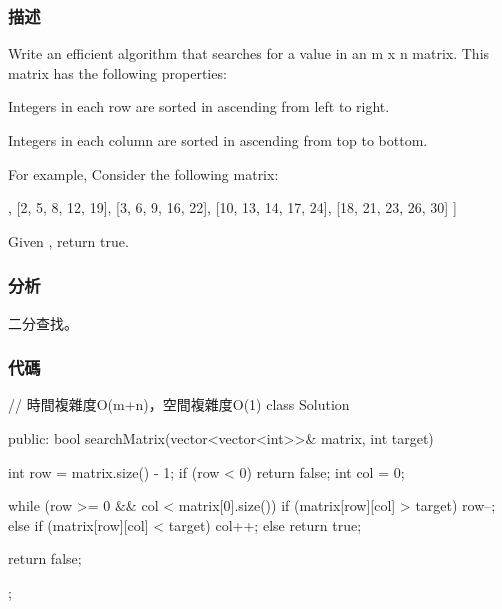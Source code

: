 \subsubsection{描述}
Write an efficient algorithm that searches for a value in an m x n matrix. This matrix has the following properties:
\begindot
\item Integers in each row are sorted in ascending from left to right.
\item Integers in each column are sorted in ascending from top to bottom.
\myenddot

For example, Consider the following matrix:
\begin{Code}
[
  [1,   4,  7, 11, 15],
  [2,   5,  8, 12, 19],
  [3,   6,  9, 16, 22],
  [10, 13, 14, 17, 24],
  [18, 21, 23, 26, 30]
]
\end{Code}
Given , return true.


\subsubsection{分析}
二分查找。


\subsubsection{代碼}
\begin{Code}
// 時間複雜度O(m+n)，空間複雜度O(1)
class Solution {
public:
    bool searchMatrix(vector<vector<int>>& matrix, int target) {
        int row = matrix.size() - 1;
        if (row < 0) return false;
        int col = 0;

        while (row >= 0 && col < matrix[0].size())
        {
            if (matrix[row][col] > target)
                row--;
            else if (matrix[row][col] < target)
                col++;
            else
                return true;
        }

        return false;
    }
};
\end{Code}

